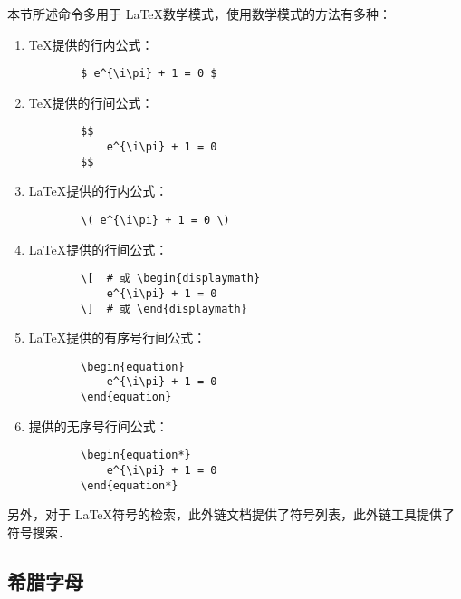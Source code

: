 本节所述命令多用于 \LaTeX 数学模式，使用数学模式的方法有多种：

\begin{enumerate}
    \item \TeX 提供的行内公式：
    \begin{verbatim}
        $ e^{\i\pi} + 1 = 0 $
    \end{verbatim}
    
    \item \TeX 提供的行间公式：
    \begin{verbatim}
        $$
            e^{\i\pi} + 1 = 0
        $$
    \end{verbatim}
    
    \item \LaTeX 提供的行内公式：
    \begin{verbatim}
        \( e^{\i\pi} + 1 = 0 \)
    \end{verbatim}
    
    \item \LaTeX 提供的行间公式：
    \begin{verbatim}
        \[  # 或 \begin{displaymath}
            e^{\i\pi} + 1 = 0
        \]  # 或 \end{displaymath}
    \end{verbatim}
    
    \item \LaTeX 提供的有序号行间公式：
    \begin{verbatim}
        \begin{equation}
            e^{\i\pi} + 1 = 0
        \end{equation}
    \end{verbatim}
    
    \item \AmS 提供的无序号行间公式：
    \begin{verbatim}
        \begin{equation*}
            e^{\i\pi} + 1 = 0
        \end{equation*}
    \end{verbatim}
\end{enumerate}

另外，对于 \LaTeX 符号的检索，此外链文档\cite{symbols}提供了符号列表，此外链工具\cite{Detexify}提供了符号搜索．

\newpage
\subsection{希腊字母}

